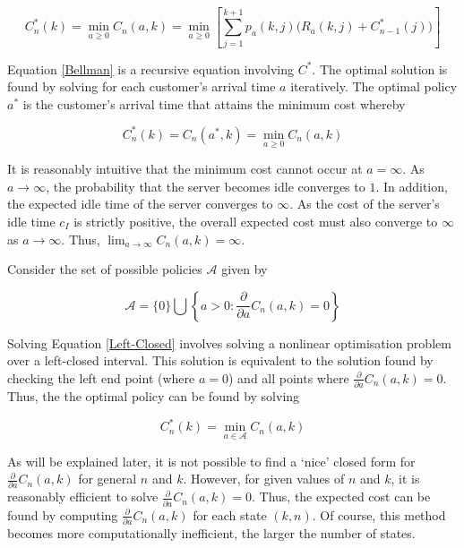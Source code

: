\begin{equation} \label{Bellman}
	C_{n}^{*} (k) = \min_{a \geq 0} C_{n} (a, k) = \min_{a \geq 0} \left[ \sum_{j = 1}^{k + 1} p_{a} (k, j) \Big( R_{a} (k, j) + C_{n - 1}^{*} (j) \Big) \right]
\end{equation}

Equation \ref{Bellman} is a recursive equation involving $C^{*}$. The optimal solution is found by solving for each customer's arrival time $a$ iteratively. The optimal policy $a^{*}$ is the customer's arrival time that attains the minimum cost whereby

\begin{equation} \label{Left-Closed}
	C_{n}^{*} (k) = C_{n} (a^{*}, k) = \min_{a \geq 0} C_{n} (a, k)
\end{equation}

It is reasonably intuitive that the minimum cost cannot occur at $a = \infty$. As $a \to \infty$, the probability that the server becomes idle converges to $1$. In addition, the expected idle time of the server converges to $\infty$. As the cost of the server's idle time $c_{I}$ is strictly positive, the overall expected cost must also converge to $\infty$ as $a \to \infty$. Thus, $\displaystyle \lim_{a \to \infty} C_{n} (a, k) = \infty$.

Consider the set of possible policies $\mathcal{A}$ given by

\begin{equation}
	\mathcal{A} = \{ 0 \} \bigcup \left\{ a > 0 : \frac{\partial}{\partial a} C_{n} (a, k) = 0 \right\}
\end{equation}

Solving Equation \ref{Left-Closed} involves solving a nonlinear optimisation problem over a left-closed interval. This solution is equivalent to the solution found by checking the left end point (where $a = 0$) and all points where $\frac{\partial}{\partial a} C_{n} (a, k) = 0$. Thus, the the optimal policy can be found by solving

\begin{equation}
	C_{n}^{*} (k) = \min_{a \in \mathcal{A}} C_{n} (a, k)
\end{equation}

As will be explained later, it is not possible to find a `nice' closed form for $\frac{\partial}{\partial a} C_{n} (a, k)$ for general $n$ and $k$. However, for given values of $n$ and $k$, it is reasonably efficient to solve $\frac{\partial}{\partial a} C_{n} (a, k) = 0$. Thus, the expected cost can be found by computing $\frac{\partial}{\partial a} C_{n} (a, k)$ for each state $(k, n)$. Of course, this method becomes more computationally inefficient, the larger the number of states.

